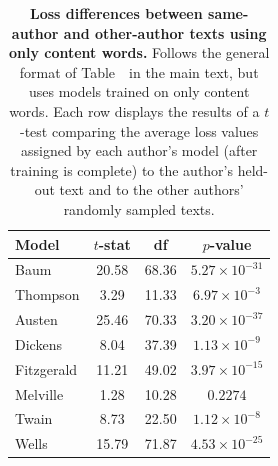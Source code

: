 \documentclass[10pt]{article}
\providecommand{\DIFaddend}{} %
\DeclareRobustCommand{\DIFaddend}{\DIFOaddend \let\includegraphics\DIFOincludegraphics} %
\begin{document}
\DIFaddend \begin{table}[h]
\centering
\small
\begin{tabular}{lccc}
\hline
\textbf{Model} & \textbf{$t$-stat} & \textbf{df} & \textbf{$p$-value}\\
\hline
Baum         & 20.58 & 68.36 & $5.27 \times 10^{-31}$  \\
Thompson     & 3.29 & 11.33 & $6.97 \times 10^{-3}$  \\
Austen       & 25.46 & 70.33 & $3.20 \times 10^{-37}$  \\
Dickens      & 8.04 & 37.39 & $1.13 \times 10^{-9}$  \\
Fitzgerald   & 11.21 & 49.02 & $3.97 \times 10^{-15}$  \\
Melville     & 1.28 & 10.28 & $0.2274$  \\
Twain        & 8.73 & 22.50 & $1.12 \times 10^{-8}$  \\
Wells        & 15.79 & 71.87 & $4.53 \times 10^{-25}$  \\
\hline
\end{tabular}

\caption{\textbf{Loss differences between same-author and other-author texts
using only content words.} Follows the general format of Table~\authortable~in
the main text, but uses models trained on only content words. Each row displays
the results of a $t$-test comparing the average loss values assigned by each
author's model (after training is complete) to the author's held-out text and
to the other authors' randomly sampled texts.}

\label{tab:t-tests-content}
\end{table}
\end{document}
